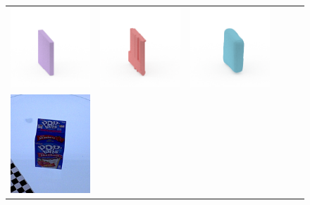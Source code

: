 \documentclass[10pt,twocolumn,letterpaper]{article}
\begin{document}
\begin{figure}
\begin{tabular}{cccccc}
\includegraphics[height=\turnheight, clip=true, trim=60 30 30 60]{data/renders_turn_table/nutrigrain_harvest_blueberry_bliss_NP1_0.mat_bb_view_0} &
\includegraphics[height=\turnheight, clip=true, trim=60 30 30 60]{data/renders_turn_table/nutrigrain_harvest_blueberry_bliss_NP1_0.mat_zheng_view_0} &
\includegraphics[height=\turnheight, clip=true, trim=60 30 30 60]{data/renders_turn_table/nutrigrain_harvest_blueberry_bliss_NP1_0.mat_oma_view_0} \\
\includegraphics[height=\turnheight, clip=true, trim=30 30 30 30]{data/rgb_ims/pop_tarts_strawberry} &

\end{tabular}
\end{figure}
\end{document}
